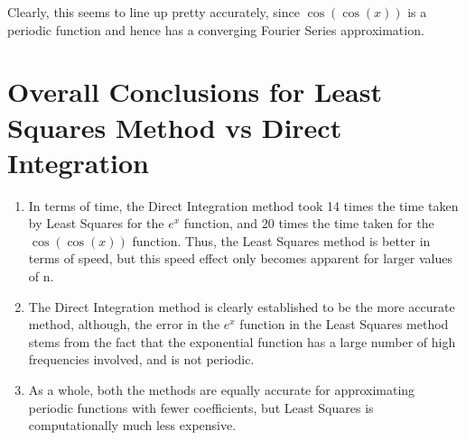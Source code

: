 \documentclass[12pt]{article}
\begin{document}
Clearly, this seems to line up pretty accurately, since $\cos(\cos(x))$ is a periodic function and hence has a converging Fourier Series approximation.

\pagebreak
\section{Overall Conclusions for Least Squares Method vs Direct Integration}
\begin{enumerate}
    \item In terms of time, the Direct Integration method took 14 times the time taken by Least Squares for the $e^x$ function, and 20 times the time taken for the $\cos(\cos(x))$ function. Thus, the Least Squares method is better in terms of speed, but this speed effect only becomes apparent for larger values of n.
    \item The Direct Integration method is clearly established to be the more accurate method, although, the error in the $e^x$ function in the Least Squares method stems from the fact that the exponential function has a large number of high frequencies involved, and is not periodic.
    \item As a whole, both the methods are equally accurate for approximating periodic functions with fewer coefficients, but Least Squares is computationally much less expensive.
\end{enumerate}
\end{document}
